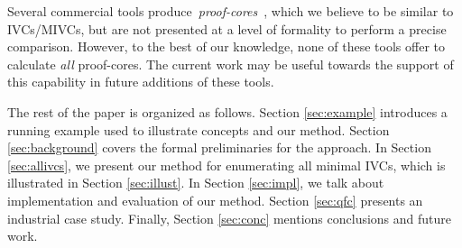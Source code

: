 Several commercial tools produce~\emph{proof-cores}~\cite{hanna2015formal, jasper_gold, Synopsys_VC_formal}, which we believe to be similar to IVCs/MIVCs, but are not presented at a level of formality to perform a precise comparison.  However, to the best of our knowledge, none of these tools offer to calculate \emph{all} proof-cores.  The current work may be useful towards the support of this capability in future additions of these tools.



The rest of the paper is organized as follows.
Section \ref{sec:example} introduces a running example used to illustrate concepts and our method.
Section \ref{sec:background} covers the formal preliminaries for the approach.
In Section \ref{sec:allivcs}, we present our method for enumerating all minimal IVCs,
which is illustrated in Section \ref{sec:illust}. In Section \ref{sec:impl}, we talk about implementation and evaluation of our method. Section \ref{sec:qfc} presents an industrial case study. Finally, Section \ref{sec:conc} mentions conclusions and future work. 